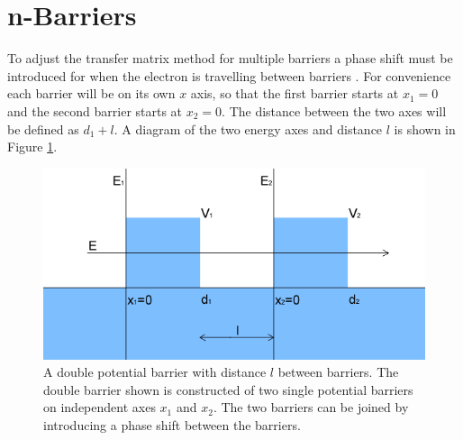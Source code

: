 \documentclass[12pt,a4paper]{report}
\begin{document}
			\section{n-Barriers}
			\label{Rectangular Barrier - n-Barriers}
				To adjust the transfer matrix method for multiple barriers a phase shift must be introduced for when the electron is travelling between barriers \cite{b18}. For convenience each barrier will be on its own $x$ axis, so that the first barrier starts at $x_{1}=0$ and the second barrier starts at $x_{2}=0$. The distance between the two axes will be defined as $d_{1}+l$. A diagram of the two energy axes and distance $l$ is shown in Figure \ref{n-barriers-x}.
				\begin{figure}[h]
					\centerline{\includegraphics[scale=0.5]{images/multiple-potential-barrier-flat}}
					\caption{A double potential barrier with distance $l$ between barriers. The double barrier shown is constructed of two single potential barriers on independent axes $x_{1}$ and $x_{2}$. The two barriers can be joined by introducing a phase shift between the barriers.}
					\label{n-barriers-x}
				\end{figure}
\end{document}
